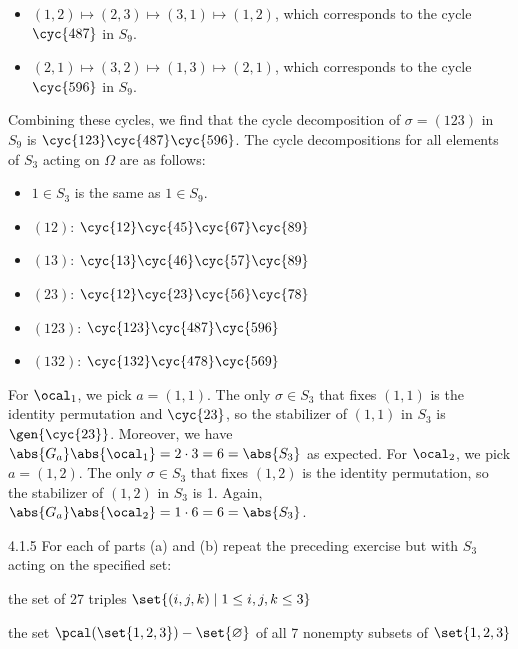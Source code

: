 \begin{sol}
\begin{itemize}
		\item $(1, 2) \mapsto (2, 3) \mapsto (3, 1) \mapsto (1, 2)$, which corresponds to the cycle $\cyc{4 8 7}$ in $S_9$.
		\item $(2, 1) \mapsto (3, 2) \mapsto (1, 3) \mapsto (2, 1)$, which corresponds to the cycle $\cyc{5 9 6}$ in $S_9$.
	\end{itemize}
	Combining these cycles, we find that the cycle decomposition of $\sigma = (1 2 3)$ in $S_9$ is $\cyc{1 2 3}\cyc{4 8 7}\cyc{5 9 6}$.
	The cycle decompositions for all elements of $S_3$ acting on $\Omega$ are as follows:
    \begin{itemize}
        \item $1 \in S_3$ is the same as $1 \in S_9$.
        \item $(1 2)$: $\cyc{1 2}\cyc{4 5}\cyc{6 7}\cyc{8 9}$
        \item $(1 3)$: $\cyc{1 3}\cyc{4 6}\cyc{5 7}\cyc{8 9}$
        \item $(2 3)$: $\cyc{1 2}\cyc{2 3}\cyc{5 6}\cyc{7 8}$
        \item $(1 2 3)$: $\cyc{1 2 3}\cyc{4 8 7}\cyc{5 9 6}$
        \item $(1 3 2)$: $\cyc{1 3 2}\cyc{4 7 8}\cyc{5 6 9}$
    \end{itemize}
	For $\ocal_1$, we pick $a = (1, 1)$.
	The only $\sigma \in S_3$ that fixes $(1, 1)$ is the identity permutation and $\cyc{2 3}$, so the stabilizer of $(1, 1)$ in $S_3$ is $\gen{\cyc{2 3}}$.
	Moreover, we have $\abs{G_a}\abs{\ocal_1} = 2 \cdot 3 = 6 = \abs{S_3}$ as expected.
	For $\ocal_2$, we pick $a = (1, 2)$.
	The only $\sigma \in S_3$ that fixes $(1, 2)$ is the identity permutation, so the stabilizer of $(1, 2)$ in $S_3$ is 1.
	Again, $\abs{G_a}\abs{\ocal_2} = 1 \cdot 6 = 6 = \abs{S_3}$.
\end{sol}

\begin{exercise}{4.1.5}
	For each of parts (a) and (b) repeat the preceding exercise but with $S_3$ acting on the specified set:
	\begin{subexercises}
		\item the set of 27 triples \(\set{(i,j,k) \mid 1 \leq i,j,k \leq 3}\)
		\item the set \(\pcal(\set{1,2,3}) - \set{\varnothing}\) of all 7 nonempty subsets of \(\set{1,2,3}\)
	\end{subexercises}
\end{exercise}

